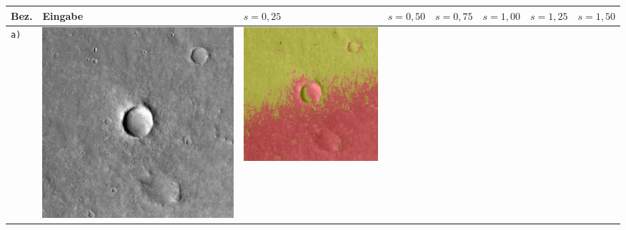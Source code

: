 \begin{table}[h!]
	\setlength\tabcolsep{0pt}
	\begin{tabularx}{\textwidth}{>{\centering}m{}
			>{\centering}m{}
			>{\centering}m{}
			>{\centering}m{}
			>{\centering}m{}
			>{\centering}m{}
			>{\centering}m{}
			>{\centering\arraybackslash}m{}}
		\toprule
		Bez. &
		Eingabe & 
		$s=0,25$ &
		$s=0,50$ &
		$s=0,75$ &
		$s=1,00$ &
		$s=1,25$ &
		$s=1,50$ \\
		\midrule
		
		\texttt{a)} &
		\includegraphics[width=0.9\linewidth]{images/p03/p03_01.png} &
		\includegraphics[width=0.9\linewidth]{images/gen/filter_size/p03_01.png_0.25.png} &

\end{tabularx}
\end{table}
